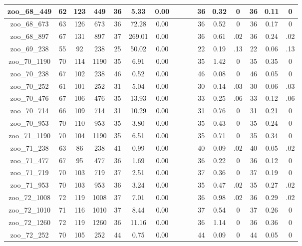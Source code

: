 \begin{landscape}
\begin{longtable}{|c|c|c|c|c|c|c|c|c|c|c|c|c|c|c|c|}
zoo\_68\_449 & 62 & 123 & 449 & 36 & 5.33 & 0.00 &  &  &  & 36 & 0.32 & 0 & 36 & 0.11 & 0 \\ \hline 
zoo\_68\_673 & 63 & 126 & 673 & 36 & 72.28 & 0.00 &  &  &  & 36 & 0.52 & 0 & 36 & 0.17 & 0 \\ \hline 
zoo\_68\_897 & 67 & 131 & 897 & 37 & 269.01 & 0.00 &  &  &  & 36 & 0.61 & .02 & 36 & 0.24 & .02 \\ \hline 
zoo\_69\_238 & 55 & 92 & 238 & 25 & 50.02 & 0.00 &  &  &  & 22 & 0.19 & .13 & 22 & 0.06 & .13 \\ \hline 
zoo\_70\_1190 & 70 & 114 & 1190 & 35 & 6.91 & 0.00 &  &  &  & 35 & 1.42 & 0 & 35 & 0.35 & 0 \\ \hline 
zoo\_70\_238 & 67 & 102 & 238 & 46 & 0.52 & 0.00 &  &  &  & 46 & 0.08 & 0 & 46 & 0.05 & 0 \\ \hline 
zoo\_70\_252 & 61 & 101 & 252 & 31 & 5.04 & 0.00 &  &  &  & 30 & 0.14 & .03 & 30 & 0.06 & .03 \\ \hline 
zoo\_70\_476 & 67 & 106 & 476 & 35 & 13.93 & 0.00 &  &  &  & 33 & 0.25 & .06 & 33 & 0.12 & .06 \\ \hline 
zoo\_70\_714 & 66 & 109 & 714 & 31 & 10.29 & 0.00 &  &  &  & 31 & 0.76 & 0 & 31 & 0.21 & 0 \\ \hline 
zoo\_70\_953 & 70 & 110 & 953 & 35 & 3.80 & 0.00 &  &  &  & 35 & 0.43 & 0 & 35 & 0.24 & 0 \\ \hline 
zoo\_71\_1190 & 70 & 104 & 1190 & 35 & 6.51 & 0.00 &  &  &  & 35 & 0.71 & 0 & 35 & 0.34 & 0 \\ \hline 
zoo\_71\_238 & 63 & 86 & 238 & 41 & 0.99 & 0.00 &  &  &  & 40 & 0.09 & .02 & 40 & 0.05 & .02 \\ \hline 
zoo\_71\_477 & 67 & 95 & 477 & 36 & 1.69 & 0.00 &  &  &  & 36 & 0.22 & 0 & 36 & 0.12 & 0 \\ \hline 
zoo\_71\_719 & 70 & 103 & 719 & 37 & 2.51 & 0.00 &  &  &  & 37 & 0.36 & 0 & 37 & 0.19 & 0 \\ \hline 
zoo\_71\_953 & 70 & 103 & 953 & 36 & 3.24 & 0.00 &  &  &  & 35 & 0.47 & .02 & 35 & 0.27 & .02 \\ \hline 
zoo\_72\_1008 & 72 & 119 & 1008 & 37 & 7.01 & 0.00 &  &  &  & 36 & 0.98 & .02 & 36 & 0.29 & .02 \\ \hline 
zoo\_72\_1010 & 71 & 116 & 1010 & 37 & 8.44 & 0.00 &  &  &  & 37 & 0.54 & 0 & 37 & 0.26 & 0 \\ \hline 
zoo\_72\_1260 & 72 & 119 & 1260 & 36 & 11.16 & 0.00 &  &  &  & 36 & 1.14 & 0 & 36 & 0.36 & 0 \\ \hline 
zoo\_72\_252 & 70 & 105 & 252 & 44 & 0.75 & 0.00 &  &  &  & 44 & 0.09 & 0 & 44 & 0.05 & 0 \\ \hline 

\end{longtable}
\end{landscape}
